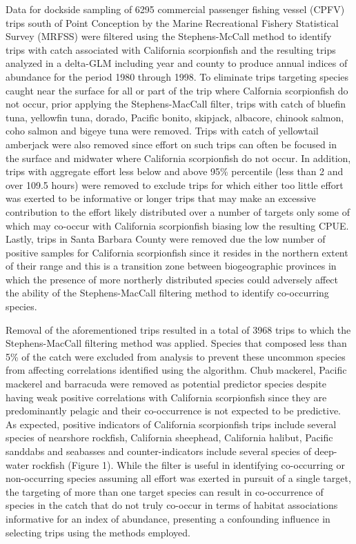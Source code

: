 \documentclass[12pt,]{article}
\begin{document}
Data for dockside sampling of 6295 commercial passenger fishing vessel
(CPFV) trips south of Point Conception by the Marine Recreational
Fishery Statistical Survey (MRFSS) were filtered using the
Stephens-McCall method to identify trips with catch associated with
California scorpionfish and the resulting trips analyzed in a delta-GLM
including year and county to produce annual indices of abundance for the
period 1980 through 1998. To eliminate trips targeting species caught
near the surface for all or part of the trip where Calfornia
scorpionfish do not occur, prior applying the Stephens-MacCall filter,
trips with catch of bluefin tuna, yellowfin tuna, dorado, Pacific
bonito, skipjack, albacore, chinook salmon, coho salmon and bigeye tuna
were removed. Trips with catch of yellowtail amberjack were also removed
since effort on such trips can often be focused in the surface and
midwater where California scorpionfish do not occur. In addition, trips
with aggregate effort less below and above 95\% percentile (less than 2
and over 109.5 hours) were removed to exclude trips for which either too
little effort was exerted to be informative or longer trips that may
make an excessive contribution to the effort likely distributed over a
number of targets only some of which may co-occur with California
scorpionfish biasing low the resulting CPUE. Lastly, trips in Santa
Barbara County were removed due the low number of positive samples for
California scorpionfish since it resides in the northern extent of their
range and this is a transition zone between biogeographic provinces in
which the presence of more northerly distributed species could adversely
affect the ability of the Stephens-MacCall filtering method to identify
co-occurring species.

Removal of the aforementioned trips resulted in a total of 3968 trips to
which the Stephens-MacCall filtering method was applied. Species that
composed less than 5\% of the catch were excluded from analysis to
prevent these uncommon species from affecting correlations identified
using the algorithm. Chub mackerel, Pacific mackerel and barracuda were
removed as potential predictor species despite having weak positive
correlations with California scorpionfish since they are predominantly
pelagic and their co-occurrence is not expected to be predictive. As
expected, positive indicators of California scorpionfish trips include
several species of nearshore rockfish, California sheephead, California
halibut, Pacific sanddabs and seabasses and counter-indicators include
several species of deep-water rockfish (Figure 1). While the filter is
useful in identifying co-occurring or non-occurring species assuming all
effort was exerted in pursuit of a single target, the targeting of more
than one target species can result in co-occurrence of species in the
catch that do not truly co-occur in terms of habitat associations
informative for an index of abundance, presenting a confounding
influence in selecting trips using the methods employed.
\end{document}
